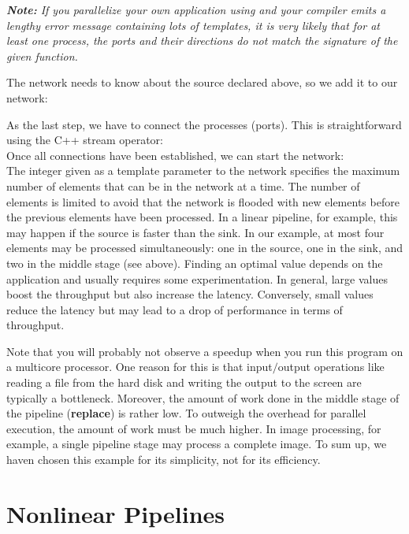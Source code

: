 \emph{\textbf{Note:} If you parallelize your own application using \embb and your compiler emits a lengthy error message containing lots of templates, it is very likely that for at least one process, the ports and their directions do not match the signature of the given function.}

The network needs to know about the source declared above, so we add it to our network:
%
\\
%

As the last step, we have to connect the processes (ports). This is straightforward using the C++ stream operator:
%
\\
%
Once all connections have been established, we can start the network:
%
\\
%
The integer given as a template parameter to the network specifies the maximum number of elements that can be in the network at a time. The number of elements is limited to avoid that the network is flooded with new elements before the previous elements have been processed. In a linear pipeline, for example, this may happen if the source is faster than the sink. In our example, at most four elements may be processed simultaneously: one in the source, one in the sink, and two in the middle stage (see above). Finding an optimal value depends on the application and usually requires some experimentation. In general, large values boost the throughput but also increase the latency. Conversely, small values reduce the latency but may lead to a drop of performance in terms of throughput.

Note that you will probably not observe a speedup when you run this program on a multicore processor. One reason for this is that input$/$output operations like reading a file from the hard disk and writing the output to the screen are typically a bottleneck. Moreover, the amount of work done in the middle stage of the pipeline (\textbf{replace}) is rather low. To outweigh the overhead for parallel execution, the amount of work must be much higher. In image processing, for example, a single pipeline stage may process a complete image. To sum up, we haven chosen this example for its simplicity, not for its efficiency.

\section{Nonlinear Pipelines}


